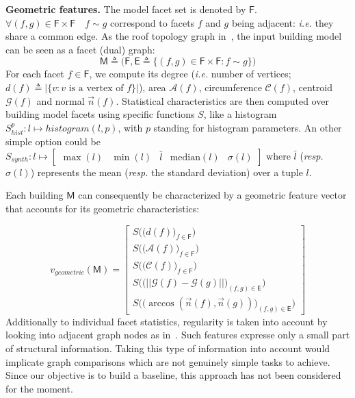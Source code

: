 \documentclass[runningheads]{llncs}
\begin{document}
\noindent
\textbf{Geometric features.}
The model facet set is denoted by $\mathsf{F}$. $\forall (f, g) \in \mathsf{F} \times \mathsf{F} \quad f \sim g$ correspond to facets $f$ and $g$ being adjacent: \textit{i.e.} they share a common edge. As the roof topology graph in~\cite{Verma2006}, the input building model can be seen as a facet (dual) graph:
\begin{equation}
	\label{eq::model_graph}
	\mathsf{M} \triangleq \Big(\mathsf{F}, \mathsf{E} \triangleq \big\{ (f, g) \in \mathsf{F} \times \mathsf{F} : f \sim g \big\} \Big)
\end{equation}
For each facet $f \in \mathsf{F}$, we compute its degree (\textit{i.e.} number of vertices; $d(f) \triangleq \vert\{v : v\text{ is a vertex of }f\}\vert$), area $\mathscr{A}(f)$, circumference $\mathscr{C}(f)$, centroid $\mathscr{G}(f)$ and  normal $\vec{n}(f)$. Statistical characteristics are then computed over building model facets using specific functions $S$, like a histogram $S^p_{hist}: l \mapsto histogram(l, p)$, with $p$ standing for histogram parameters. An other simple option could be $S_{synth}: l \mapsto \begin{bmatrix}
\max(l)& \min(l) & \bar{l} & \text{median}(l) & \sigma(l)
\end{bmatrix}$ where $\bar{l}$ (\textit{resp.} $\sigma(l)$) represents the mean (\textit{resp.} the standard deviation) over a tuple $l$.

Each building $\mathsf{M}$ can consequently be characterized by a geometric feature vector that accounts for its geometric characteristics:

\begin{equation}
	\label{eq::geom_feat}
    v_{geometric}(\mathsf{M}) = \begin{bmatrix}
    	S \Big(\big(d(f)\big)_{f \in \mathsf{F}}\Big)\\
    	S \Big(\big(\mathscr{A}(f)\big)_{f \in \mathsf{F}}\Big)\\
    	S \Big(\big(\mathscr{C}(f)\big)_{f \in \mathsf{F}}\Big)\\
    	S \Big(\big( \vert\vert \mathscr{G}(f) - \mathscr{G}(g) \vert\vert \big)_{(f,g) \in \mathsf{E}}\Big)\\
    	S\Big(\big( \arccos(\vec{n}(f), \vec{n}(g)) \big)_{(f,g) \in \mathsf{E}}\Big)
    \end{bmatrix}
\end{equation}
Additionally to individual facet statistics, regularity is taken into account by looking into adjacent graph nodes as in~\cite{Zhou2012}. Such features expresse only a small part of structural information. Taking this type of information into account would implicate graph comparisons which are not genuinely simple tasks to achieve. Since our objective is to build a baseline, this approach has not been considered for the moment.
\end{document}
